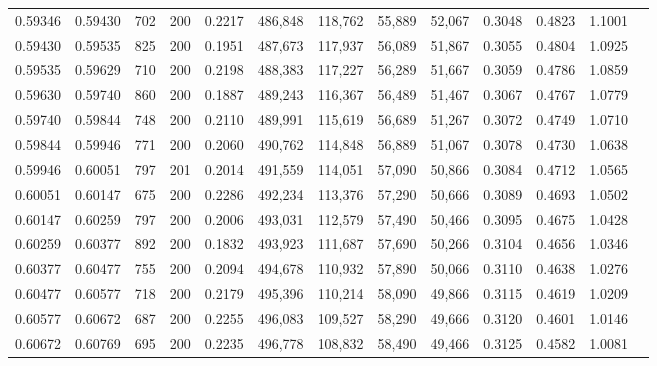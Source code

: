 \begin{tabular}{rrrrrrrrrrrrr}
0.59346 & 0.59430 &   702 & 200 &                                     0.2217 & 486,848 & 118,762 &  55,889 &  52,067 & 0.3048 & 0.4823 & 1.1001 \\
0.59430 & 0.59535 &   825 & 200 &                                     0.1951 & 487,673 & 117,937 &  56,089 &  51,867 & 0.3055 & 0.4804 & 1.0925 \\
0.59535 & 0.59629 &   710 & 200 &                                     0.2198 & 488,383 & 117,227 &  56,289 &  51,667 & 0.3059 & 0.4786 & 1.0859 \\
0.59630 & 0.59740 &   860 & 200 &                                     0.1887 & 489,243 & 116,367 &  56,489 &  51,467 & 0.3067 & 0.4767 & 1.0779 \\
0.59740 & 0.59844 &   748 & 200 &                                     0.2110 & 489,991 & 115,619 &  56,689 &  51,267 & 0.3072 & 0.4749 & 1.0710 \\
0.59844 & 0.59946 &   771 & 200 &                                     0.2060 & 490,762 & 114,848 &  56,889 &  51,067 & 0.3078 & 0.4730 & 1.0638 \\
0.59946 & 0.60051 &   797 & 201 &                                     0.2014 & 491,559 & 114,051 &  57,090 &  50,866 & 0.3084 & 0.4712 & 1.0565 \\
0.60051 & 0.60147 &   675 & 200 &                                     0.2286 & 492,234 & 113,376 &  57,290 &  50,666 & 0.3089 & 0.4693 & 1.0502 \\
0.60147 & 0.60259 &   797 & 200 &                                     0.2006 & 493,031 & 112,579 &  57,490 &  50,466 & 0.3095 & 0.4675 & 1.0428 \\
0.60259 & 0.60377 &   892 & 200 &                                     0.1832 & 493,923 & 111,687 &  57,690 &  50,266 & 0.3104 & 0.4656 & 1.0346 \\
0.60377 & 0.60477 &   755 & 200 &                                     0.2094 & 494,678 & 110,932 &  57,890 &  50,066 & 0.3110 & 0.4638 & 1.0276 \\
0.60477 & 0.60577 &   718 & 200 &                                     0.2179 & 495,396 & 110,214 &  58,090 &  49,866 & 0.3115 & 0.4619 & 1.0209 \\
0.60577 & 0.60672 &   687 & 200 &                                     0.2255 & 496,083 & 109,527 &  58,290 &  49,666 & 0.3120 & 0.4601 & 1.0146 \\
0.60672 & 0.60769 &   695 & 200 &                                     0.2235 & 496,778 & 108,832 &  58,490 &  49,466 & 0.3125 & 0.4582 & 1.0081 \\

\end{tabular}
